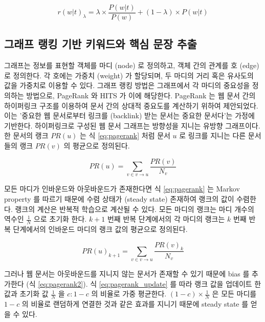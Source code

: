 \documentclass[oneside, ko,phd]{snuthesis_utf8_kor}
\begin{document}
\begin{equation}
  \label{eq:ldavis}
  r(w \vert t)_\lambda = \lambda \times \frac{P(w \vert t)}{P(w)} + (1 - \lambda) \times P(w \vert t)
\end{equation}

\subsection{그래프 랭킹 기반 키워드와 핵심 문장 추출}

그래프는 정보를 표현할 객체를 마디 (node) 로 정의하고, 객체 간의 관계를 호 (edge) 로 정의한다.
각 호에는 가중치 (weight) 가 할당되며, 두 마디의 거리 혹은 유사도의 값을 가중치로 이용할 수 있다.
그래프 랭킹 방법은 그래프에서 각 마디의 중요성을 정의하는 방법으로, PageRank \cite{ilprints422}와 HITS \cite{kleinberg1999authoritative} 가 이에 해당한다.
PageRank 는 웹 문서 간의 하이퍼링크 구조를 이용하여 문서 간의 상대적 중요도를 계산하기 위하여 제안되었다.
이는 '중요한 웹 문서로부터 링크를 (backlink) 받는 문서는 중요한 문서다'는 가정에 기반한다.
하이퍼링크로 구성된 웹 문서 그래프는 방향성을 지니는 유방향 그래프이다.
한 문서의 랭크 $PR(u)$ 는 식 \ref{eq:pagerank} 처럼 문서 $u$ 로 링크를 지니는 다른 문서들의 랭크 $PR(v)$ 의 평균으로 정의된다.

\begin{equation}
  \label{eq:pagerank}
  PR(u) = \sum_{v \in v \rightarrow u} \frac{PR(v)}{N_v}
\end{equation}

모든 마디가 인바운드와 아웃바운드가 존재한다면 식 \ref{eq:pagerank} 는 Markov property 를 따르기 때문에 수렴 상태가 (steady state) 존재하여 랭크의 값이 수렴한다.
랭크의 계산은 반복적 학습으로 계산될 수 있다.
모든 마디의 랭크는 마디 개수의 역수인 $\frac{1}{N}$ 으로 초기화 한다.
$k+1$ 번째 반복 단계에서의 각 마디의 랭크는 $k$ 번째 반복 단계에서의 인바운드 마디의 랭크 값의 평균으로 정의된다.

\begin{equation}
  \label{eq:pagerank_update}
  PR(u)_{k+1} = \sum_{v \in v \rightarrow u} \frac{PR(v)_k}{N_v}
\end{equation}

그러나 웹 문서는 아웃바운드를 지니지 않는 문서가 존재할 수 있기 때문에 bias 를 추가한다 (식 \ref{eq:pagerank2}).
식 \ref{eq:pagerank_update} 를 따라 랭크 값을 업데이트 한 값과 초기화 값 $\frac{1}{N}$ 을 $c : 1-c$ 의 비율로 가중 평균한다.
$(1-c) \times \frac{1}{N}$ 은 모든 마디를 $1-c$ 의 비율로 랜덤하게 연결한 것과 같은 효과를 지니기 때문에 steady state 를 얻을 수 있다.
\end{document}
